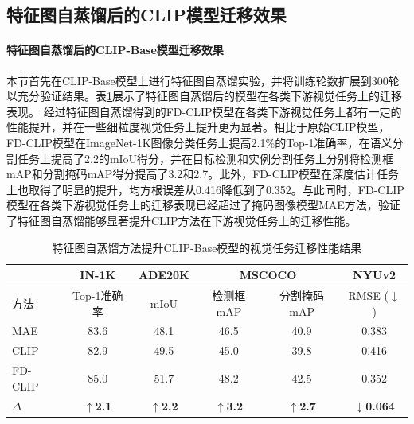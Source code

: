 \subsection{特征图自蒸馏后的CLIP模型迁移效果}
\label{sec:fd-exp-clip}
\paragraph{特征图自蒸馏后的CLIP-Base模型迁移效果} 本节首先在CLIP-Base模型上进行特征图自蒸馏实验，并将训练轮数扩展到300轮以充分验证结果。表\ref{tab:fd-clip_FD}展示了特征图自蒸馏后的模型在各类下游视觉任务上的迁移表现。
经过特征图自蒸馏得到的FD-CLIP模型在各类下游视觉任务上都有一定的性能提升，并在一些细粒度视觉任务上提升更为显著。相比于原始CLIP模型，FD-CLIP模型在ImageNet-1K图像分类任务上提高2.1\%的Top-1准确率，在语义分割任务上提高了2.2的mIoU得分，并在目标检测和实例分割任务上分别将检测框mAP和分割掩码mAP得分提高了3.2和2.7。此外，FD-CLIP模型在深度估计任务上也取得了明显的提升，均方根误差从0.416降低到了0.352。与此同时，FD-CLIP模型在各类下游视觉任务上的迁移表现已经超过了掩码图像模型MAE方法，验证了特征图自蒸馏能够显著提升CLIP方法在下游视觉任务上的迁移性能。

\begin{table}
\caption{特征图自蒸馏方法提升CLIP-Base模型的视觉任务迁移性能结果
}
\centering
  \begin{tabular}{lccccc}
\toprule
   & IN-1K & ADE20K & \multicolumn{2}{c}{MSCOCO} & NYUv2 \\
   \midrule
方法    &   Top-1准确率 &  mIoU  & 检测框mAP & 分割掩码mAP & RMSE\scriptsize{ ($\downarrow$)}\\
  \midrule
  MAE & 83.6 & 48.1 & 46.5 & 40.9 & 0.383 \\

  \midrule
  
  CLIP & 82.9  & 49.5 & 45.0 & 39.8 & 0.416 \\
  FD-CLIP & 85.0  & 51.7 & 48.2 & 42.5 & 0.352 \\
  $\Delta$ & \textbf{$\uparrow$2.1}  &  \textbf{$\uparrow$2.2} & \textbf{$\uparrow$3.2} & \textbf{$\uparrow$2.7} & \textbf{$\downarrow$0.064}\\
\bottomrule
  \end{tabular}
\label{tab:fd-clip_FD}
\end{table}

